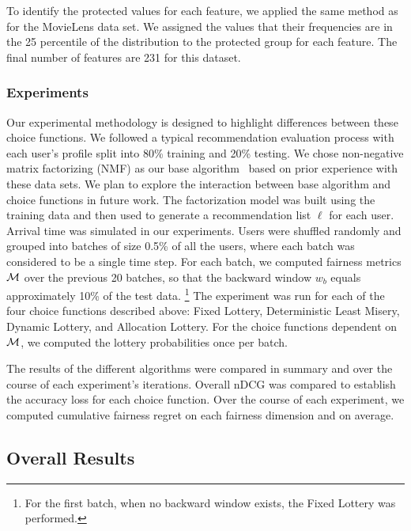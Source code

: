 To identify the protected values for each feature, we applied the same method as for the MovieLens data set. We assigned the values that their frequencies are in the 25 percentile of the distribution to the protected group for each feature. The final number of features are 231 for this dataset.

\subsubsection{\textbf{Experiments}}
\hfill

Our experimental methodology is designed to highlight differences between these choice functions. We followed a typical recommendation evaluation process with each user's profile split into 80\% training and 20\% testing. We chose non-negative matrix factorizing (NMF) as our base algorithm~\cite{takacs2008investigation} based on prior experience with these data sets. We plan to explore the interaction between base algorithm and choice functions in future work. The factorization model was built using the training data and then used to generate a recommendation list $\ell$ for each user.
Arrival time was simulated in our experiments. Users were shuffled randomly and grouped into batches of size 0.5\% of all the users, where each batch was considered to be a single time step. For each batch, we computed fairness metrics $\mathcal{M}$ over the previous 20 batches, so that the backward window $w_b$ equals approximately 10\% of the test data. \footnote{For the first batch, when no backward window exists, the Fixed Lottery was performed.} The experiment was run for each of the four choice functions described above: Fixed Lottery, Deterministic Least Misery, Dynamic Lottery, and Allocation Lottery. For the choice functions dependent on $\mathcal{M}$, we computed the lottery probabilities once per batch. 

The results of the different algorithms were compared in summary and over the course of each experiment's iterations. Overall nDCG was compared to establish the accuracy loss for each choice function. Over the course of each experiment, we computed cumulative fairness regret on each fairness dimension and on average. 

\subsection{Overall Results}

